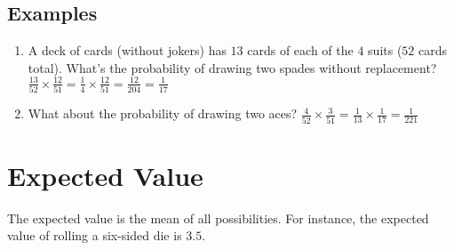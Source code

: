 \documentclass[letterpaper,10pt]{article}
\begin{document}
\subsection{Examples}
\begin{enumerate}
 \item A deck of cards (without jokers) has $13$ cards of each of the $4$ suits ($52$ cards total). What's
 the probability of drawing two spades without replacement?
 $\frac{13}{52} \times \frac{12}{51} = \frac{1}{4} \times \frac{12}{51} = \frac{12}{204} = \frac{1}{17}$
 \item What about the probability of drawing two aces?
 $\frac{4}{52} \times \frac{3}{51} = \frac{1}{13} \times \frac{1}{17} = \frac{1}{221}$
\end{enumerate}

\section{Expected Value}

The expected value is the mean of all possibilities. For instance, the expected value of rolling a six-sided
die is $3.5$.
\end{document}

